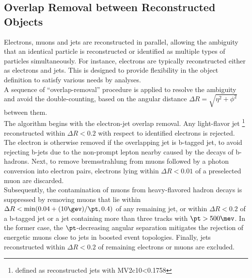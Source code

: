 





\subsection{Overlap Removal between Reconstructed Objects} \label{sec::objDef::OR}
Electrons, muons and jets are reconstructed in parallel, allowing the ambiguity that an identical particle is reconstructed or identified as multiple types of particles simultaneously. 
For instance, electrons are typically reconstructed either as electrons and jets. 
This is designed to provide flexibility in the object definition to satisfy various needs by analyses.  \\

A sequence of ``overlap-removal'' procedure is applied to resolve the ambiguity and avoid the double-counting, based on the angular distance $\Delta R = \sqrt{\eta^2+\phi^2}$ between them.  \\

The algorithm begins with the electron-jet overlap removal.
Any light-flavor jet \footnote{defined as reconstructed jets with MV2c10<0.1758} 
reconstructed within $\Delta R < 0.2$ with respect to identified electrons is rejected.
The electron is otherwise removed if the overlapping jet is b-tagged jet, 
to avoid rejecting b-jets due to the non-prompt lepton nearby caused by the decays of b-hadrons. Next, to remove bremsstrahlung from muons followed by a photon conversion into electron pairs, electrons lying within $\Delta R < 0.01$ of a preselected muon are discarded.  \\

Subsequently, the contamination of muons from heavy-flavored hadron decays is suppressed by removing muons that lie within $\Delta R < \min(0.04 + (10 \gev)/\pt, 0.4)$ of any remaining jet, or within $\Delta R < 0.2$ of a b-tagged jet or a jet containing more than three tracks with $\pt > 500 \mev$.
In the former case, the $\pt$-decreasing angular separation mitigates the rejection of energetic muons close to jets in boosted event topologies. Finally, jets reconstructed within $\Delta R < 0.2$ of remaining electrons or muons are excluded. \\

